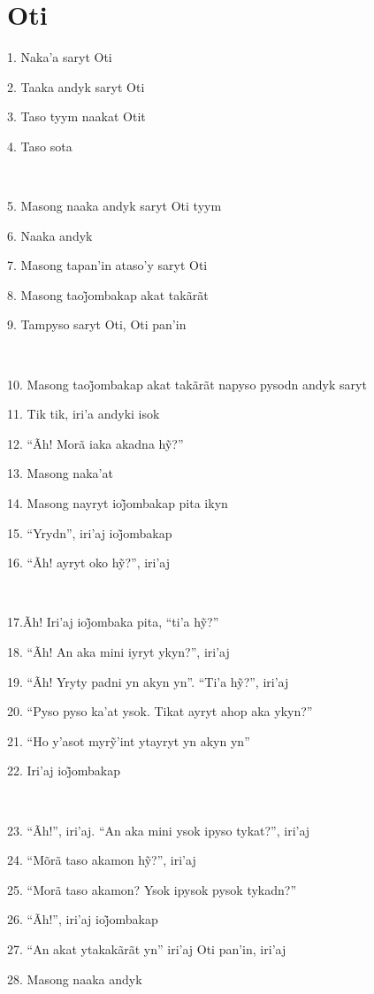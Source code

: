 \chapter*{Oti}

1. Naka'a saryt Oti

2. Taaka andyk saryt Oti

3. Taso tyym naakat Otit

4. Taso sota

~

5. Masong naaka andyk saryt Oti tyym

6. Naaka andyk

7. Masong tapan'in ataso'y saryt Oti

8. Masong taoj̃ombakap akat takãrãt

9. Tampyso saryt Oti, Oti pan'in

~

10. Masong taoj̃ombakap akat takãrãt napyso pysodn andyk saryt

11. Tik tik, iri'a andyki isok

12. ``Ãh! Morã iaka akadna hỹ?''

13. Masong naka'at

14. Masong nayryt ioj̃ombakap pita ikyn

15. ``Yrydn'', iri’aj ioj̃ombakap

16. ``Ãh! ayryt oko hỹ?'', iri’aj

~

17.Ãh! Iri’aj ioj̃ombaka pita, ``ti’a hỹ?''

18. ``Ãh! An aka mini iyryt ykyn?'', iri'aj

19. ``Ãh! Yryty padni yn akyn yn''. ``Ti’a hỹ?'', iri’aj

20. ``Pyso pyso ka'at ysok. Tikat ayryt ahop aka ykyn?''

21. ``Ho y’asot myrỹ’int ytayryt yn akyn yn''

22. Iri’aj ioj̃ombakap

~

23. ``Ãh!'', iri'aj. ``An aka mini ysok ipyso tykat?'', iri'aj

24. ``Mõrã taso akamon hỹ?'', iri’aj

25. ``Morã taso akamon? Ysok ipysok pysok tykadn?''

26. ``Ãh!'', iri’aj ioj̃ombakap

27. ``An akat ytakakãrãt yn'' iri'aj Oti pan'in, iri'aj

28. Masong naaka andyk

~

